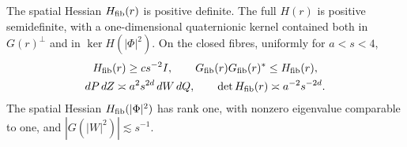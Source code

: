 \begin{lemma}\label{lem:fibre}
The spatial Hessian $H_{\mathrm{fib}}(r)$ is positive definite. The full $H(r)$ is positive semidefinite,
with a one-dimensional quaternionic kernel contained both in $G(r)^\perp$ and in
$\ker H(|\Phi|^2)$. On the closed fibres, uniformly for $a<s<4$,
\begin{gather}
H_{\mathrm{fib}}(r)\ge cs^{-2}I,\qquad G_{\mathrm{fib}}(r)G_{\mathrm{fib}}(r)^*\le H_{\mathrm{fib}}(r),\label{eq:fibre1}\\
dP\,dZ\asymp a^2s^{2d}\,dW\,dQ,\qquad\det H_{\mathrm{fib}}(r)\asymp a^{-2}s^{-2d}.\label{eq:fibre2}
\end{gather}
The spatial Hessian $H_{\mathrm{fib}}(|\Phi|^2)$ has rank one, with nonzero eigenvalue comparable to one,
and $|G(|W|^2)|\lesssim s^{-1}$.
\end{lemma}

